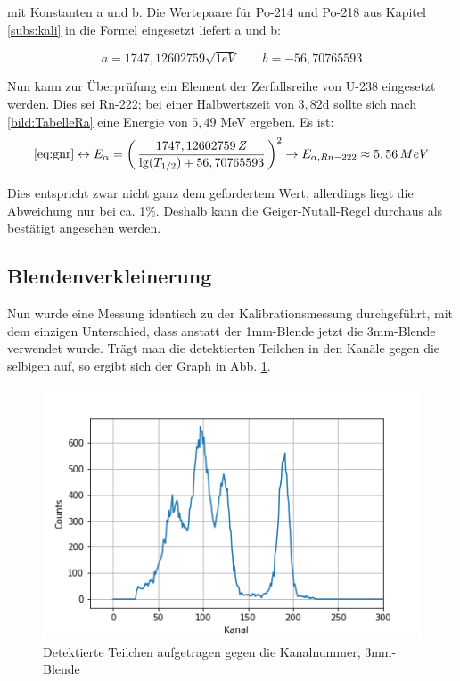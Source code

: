 mit Konstanten a und b. Die Wertepaare für Po-214 und Po-218 aus Kapitel \ref{subs:kali} in die Formel eingesetzt liefert a und b:

\begin{equation}
    a = 1747,12602759 \sqrt{1eV} \qquad b = -56,70765593
\end{equation}

Nun kann zur Überprüfung ein Element der Zerfallsreihe von U-238 eingesetzt werden. Dies sei Rn-222; bei einer Halbwertszeit von 
$3,82$d sollte sich nach \ref{bild:TabelleRa} eine Energie von $5,49$ MeV ergeben. Es ist: \\

\begin{equation*}
    \ref{eq:gnr}  \leftrightarrow E_{\alpha} = \biggl(\,\frac{1747,12602759 \, Z}{\lg(T_{1/2})+56,70765593}\, \biggr)^2 \\
    \to E_{\alpha, Rn-222} \approx 5,56 \, MeV
\end{equation*}

Dies entspricht zwar nicht ganz dem gefordertem Wert, allerdings liegt die Abweichung nur bei ca. 1\%. Deshalb kann die 
Geiger-Nutall-Regel durchaus als bestätigt angesehen werden.

\subsection{Blendenverkleinerung}

Nun wurde eine Messung identisch zu der Kalibrationsmessung durchgeführt, mit dem einzigen Unterschied, dass anstatt der 1mm-Blende 
jetzt die 3mm-Blende verwendet wurde. Trägt man die detektierten Teilchen in den Kanäle gegen die selbigen auf, so ergibt sich der 
Graph in Abb. \ref{bild:blende}. \\

\begin{figure}[h]
    \centering
    \includegraphics[scale=0.65]{Bilder/blende.png}
    \caption{Detektierte Teilchen aufgetragen gegen die Kanalnummer, 3mm-Blende}
    \label{bild:blende}
\end{figure}

